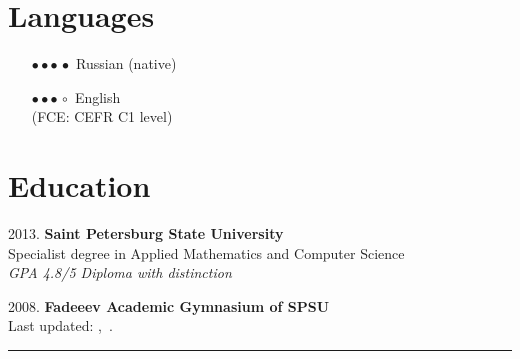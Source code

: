 \documentclass[a4paper,10pt]{article}
\begin{document}
\begin{adjustbox}{valign=t}
\begin{minipage}{0.3\textwidth}
\section*{Languages}
\raggedright
\begin{enumerate}[align = left, labelwidth = 4em, leftmargin = \dimexpr\labelwidth + \labelsep\relax]
	\item [\textcolor{ColorOne}{$\bullet \bullet \bullet \, \bullet $}] Russian (native)
	\item [\textcolor{ColorOne}{$\bullet \bullet \bullet \, \circ $}] English \\(FCE: CEFR C1 level)
\end{enumerate}
\vfill

\section*{Education}
\raggedright
\textcolor{ColorOne}{2013.}
\textbf{Saint Petersburg State University}\\
Specialist degree in Applied Mathematics and Computer Science\\
\textit{GPA 4.8/5 Diploma with distinction}
\vspace{10 pt}

\textcolor{ColorOne}{2008.}
\textbf{Fadeeev Academic Gymnasium of SPSU}\\

	
\vspace{140 pt}
\centering \small
\textcolor{ColorOne}{Last updated: \monthname,~\the\year.}

\end{minipage}
\end{adjustbox}
%
\hfill
\begin{adjustbox}{valign=t}
\begin{minipage}{0.02\textwidth} %
\textcolor{ColorOne}{\rule{1pt}{\textheight}}
\end{minipage}
\end{adjustbox}
\end{document}
